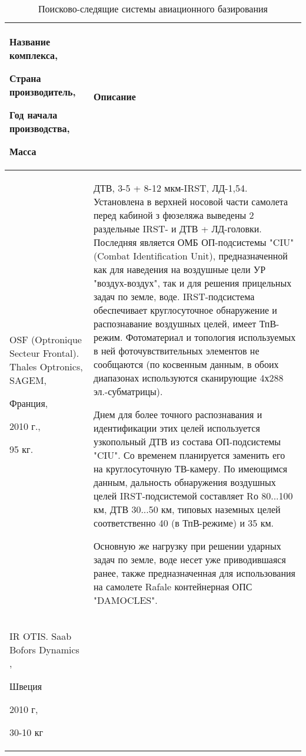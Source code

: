 \begin{landscape}

\begin{longtable}{| p{6cm} | p{18cm} |}
	\caption{Поисково-следящие системы авиационного базирования}%
	\label{tab:EOS}%
	\\ \hline
		Название комплекса, 
		
		Страна производитель, 
		
		Год начала производства, 
		
		Масса 
		& 
		Описание 
	\\ \hline
		OSF (Optronique Secteur Frontal). Thales Optronics, SAGEM, \cite[]{OSF}
		
		Франция, 
		
		2010 г., 
		
		95 кг.    
	& 
		ДТВ, 3-5 + 8-12 мкм-IRST, ЛД-1,54. Установлена в верхней носовой части самолета перед кабиной з фюзеляжа выведены 2 раздельные IRST- и ДТВ + ЛД-головки. Последняя является ОМБ ОП-подсистемы "CIU" (Combat Identification Unit), предназначенной как для наведения на воздушные цели УР "воздух-воздух", так и для решения прицельных задач по земле, воде. 
		IRST-подсистема обеспечивает круглосуточное обнаружение и распознавание воздушных целей, имеет ТпВ-режим. Фотоматериал и топология используемых в ней фоточувствительных элементов не сообщаются (по косвенным данным, в обоих диапазонах используются сканирующие 4х288 эл.-субматрицы). 
		
		
		Днем для более точного распознавания и идентификации этих целей используется узкопольный ДТВ из состава ОП-подсистемы "CIU". Со временем планируется заменить его на круглосуточную ТВ-камеру. По имеющимся данным, дальность обнаружения воздушных целей IRST-подсистемой составляет Rо 80...100 км, ДТВ 30...50 км, типовых наземных целей соответственно 40 (в ТпВ-режиме) и 35 км. 
		
		Основную же нагрузку при решении ударных задач по земле, воде несет уже приводившаяся ранее, также предназначенная для использования на самолете Rafale контейнерная ОПС "DAMOCLES".
	\\ \hline
		IR OTIS. Saab Bofors Dynamics \cite[]{doi:10.1117/12.450557},
		
		Швеция	
		
		2010 г,	
		
		30-10 кг
		           

\end{longtable}
\end{landscape}
